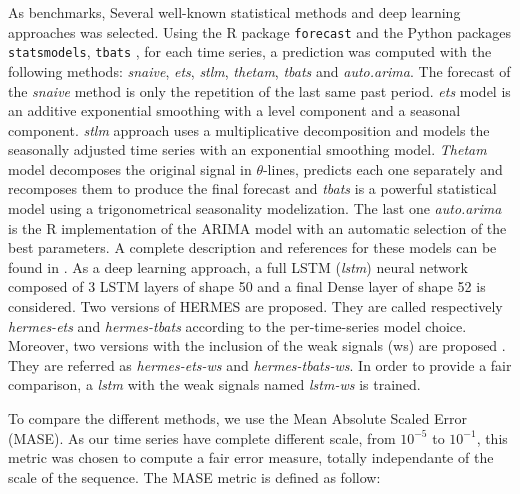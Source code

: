 \documentclass{article} %
\begin{document}
As benchmarks, Several well-known statistical methods and deep learning approaches was selected. Using the R package \texttt{forecast} and the Python packages \texttt{statsmodels},  \texttt{tbats} , for each time series, a prediction was computed with the following methods: \textit{snaive}, \textit{ets}, \textit{stlm}, \textit{thetam}, \textit{tbats} and \textit{auto.arima}. The forecast of the \textit{snaive} method is only the repetition of the last same past period. \textit{ets} model is an additive exponential smoothing with a level component and a seasonal component. \textit{stlm} approach uses a multiplicative decomposition and models the seasonally adjusted time series with an exponential smoothing model. \textit{Thetam} model decomposes the original signal in $\theta$-lines, predicts each one separately and recomposes them to produce the final forecast and \textit{tbats} is a powerful statistical model using a trigonometrical seasonality modelization. The last one \textit{auto.arima} is the R implementation of the ARIMA model with an automatic selection of the best parameters. A complete description and references for these models can be found in \citep{hyndman2020package}. As a deep learning approach, a full LSTM (\textit{lstm}) neural network composed of 3 LSTM layers of shape 50 and a final Dense layer of shape 52 is considered.
Two versions of HERMES are proposed. They are called respectively \textit{hermes-ets} and \textit{hermes-tbats} according to the per-time-series model choice.
Moreover, two versions with the inclusion of the weak signals (ws) are proposed . They are referred as \textit{hermes-ets-ws} and \textit{hermes-tbats-ws}. In order to provide a fair comparison, a \textit{lstm} with the weak signals named \textit{lstm-ws} is trained.

To compare the different methods, we use the Mean Absolute Scaled Error (MASE). As our time series have complete different scale, from $10^{-5}$ to $10^{-1}$, this metric was chosen to compute a fair error measure, totally independante of the scale of the sequence. The MASE metric is defined as follow:
 
\end{document}
